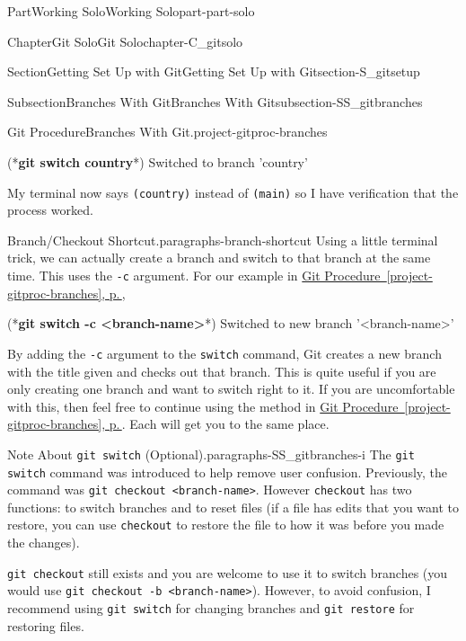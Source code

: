 \documentclass[twoside,10pt,]{book}
\newcommand{\xreffont}{\relax}
\newcommand{\mono}[1]{\texttt{#1}}
\newcommand{\consoleinput}[1]{\textbf{#1}}
\begin{document}
\begin{partptx}{Part}{Working Solo}{}{Working Solo}{}{}{part-part-solo}
\begin{chapterptx}{Chapter}{Git Solo}{}{Git Solo}{}{}{chapter-C_gitsolo}
\begin{sectionptx}{Section}{Getting Set Up with Git}{}{Getting Set Up with Git}{}{}{section-S_gitsetup}
\begin{subsectionptx}{Subsection}{Branches With Git}{}{Branches With Git}{}{}{subsection-SS_gitbranches}
\begin{project}{Git Procedure}{Branches With Git.}{project-gitproc-branches}
\begin{enumerate}[font=\bfseries,label=(\alph*),ref=\alph*]
\begin{console}{0}{1}{0}
(*\consoleinput{git switch country}*)
Switched to branch 'country'
\end{console}
My terminal now says \mono{(country)} instead of \mono{(main)} so I have verification that the process worked.%
\end{enumerate}%
\end{project}%
\begin{paragraphs}{Branch\slash{}Checkout Shortcut.}{paragraphs-branch-shortcut}%
Using a little terminal trick, we can actually create a branch and switch to that branch at the same time. This uses the \mono{-c} argument. For our example in \hyperref[project-gitproc-branches]{Git Procedure~{\xreffont\ref{project-gitproc-branches}}, p.\,\pageref{project-gitproc-branches}},%
\begin{console}{0}{1}{0}
(*\consoleinput{git switch -c <branch-name>}*)
Switched to new branch '<branch-name>'
\end{console}
By adding the \mono{-c} argument to the \mono{switch} command, Git creates a new branch with the title given and checks out that branch. This is quite useful if you are only creating one branch and want to switch right to it. If you are uncomfortable with this, then feel free to continue using the method in \hyperref[project-gitproc-branches]{Git Procedure~{\xreffont\ref{project-gitproc-branches}}, p.\,\pageref{project-gitproc-branches}}. Each will get you to the same place.%
\end{paragraphs}%
\begin{paragraphs}{Note About \mono{git switch} (Optional).}{paragraphs-SS_gitbranches-i}%
The \mono{git switch} command was introduced to help remove user confusion. Previously, the command was \mono{git checkout <branch-name>}. However \mono{checkout} has two functions: to switch branches and to reset files (if a file has edits that you want to restore, you can use \mono{checkout} to restore the file to how it was before you made the changes).%
\par
\mono{git checkout} still exists and you are welcome to use it to switch branches (you would use \mono{git checkout -b <branch-name>}). However, to avoid confusion, I recommend using \mono{git switch} for changing branches and \mono{git restore} for restoring files.%
\end{paragraphs}%
\end{subsectionptx}
\begin{conclusion}{}%

\end{conclusion}
\end{sectionptx}
\end{chapterptx}
\end{partptx}
\end{document}
